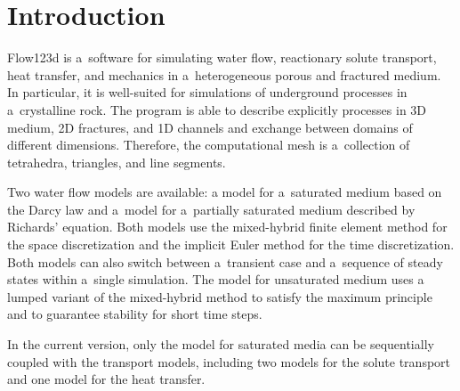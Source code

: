 %
%
%
%
%


\section{Introduction}
Flow123d is a~software for simulating water flow, reactionary solute transport, heat transfer, and mechanics in a~heterogeneous
porous and fractured medium. In particular, it is well-suited for simulations of underground processes in a~crystalline rock.
The program is able to describe explicitly processes in 3D medium, 2D fractures, and 1D channels and exchange between 
domains of different dimensions. Therefore, the computational mesh is a~collection of tetrahedra, triangles, and line segments.

Two water flow models are available: a model for a~saturated medium based on the Darcy law
and a~model for a~partially saturated medium described by Richards' equation.
Both models use the mixed-hybrid finite element method for the space discretization and the implicit Euler method for the time 
discretization.
Both models can also switch between a~transient case and a~sequence of steady states within a~single simulation. The model for 
unsaturated medium uses a lumped variant of the mixed-hybrid method to satisfy the maximum principle and to guarantee stability 
for short time steps.

In the current version,  only the model for saturated media can be sequentially coupled  with the transport models, including
two models for the solute transport and one model for the heat transfer.


